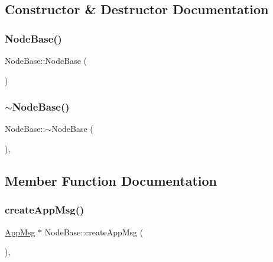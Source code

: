 \subsection{Constructor \& Destructor Documentation}
\mbox{\label{classNodeBase_ab6ea4e77947d5b9b8da66d37dc432e7f}} 
\subsubsection{\texorpdfstring{Node\+Base()}{NodeBase()}}
{\footnotesize\ttfamily Node\+Base\+::\+Node\+Base (\begin{DoxyParamCaption}{ }\end{DoxyParamCaption})\hspace{0.3cm}{\ttfamily [protected]}}

\mbox{\label{classNodeBase_a2fd7f7080282b6af95ba0b09fd30679d}} 
\subsubsection{\texorpdfstring{$\sim$\+Node\+Base()}{~NodeBase()}}
{\footnotesize\ttfamily Node\+Base\+::$\sim$\+Node\+Base (\begin{DoxyParamCaption}{ }\end{DoxyParamCaption})\hspace{0.3cm}{\ttfamily [protected]}, {\ttfamily [virtual]}}



\subsection{Member Function Documentation}
\mbox{\label{classNodeBase_ac8b9e21b1cc32fd86aaa6c956b93a7c3}} 
\subsubsection{\texorpdfstring{create\+App\+Msg()}{createAppMsg()}}
{\footnotesize\ttfamily \hyperlink{classAppMsg}{App\+Msg} $\ast$ Node\+Base\+::create\+App\+Msg (\begin{DoxyParamCaption}{ }\end{DoxyParamCaption})\hspace{0.3cm}{\ttfamily [protected]}, {\ttfamily [virtual]}}




